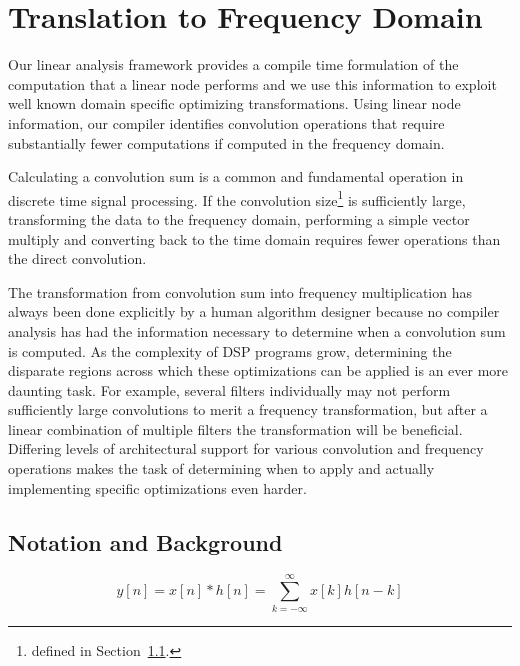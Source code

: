 
\section{Translation to Frequency Domain}
\label{sec:freq}

Our linear analysis framework provides a compile time formulation of
the computation that a linear node performs and we use this
information to exploit well known domain specific optimizing
transformations. Using linear node information, our compiler
identifies convolution operations that require substantially fewer
computations if computed in the frequency domain.

Calculating a convolution sum is a common and fundamental operation in
discrete time signal processing.  If the convolution size\footnote{
defined in Section~\ref{sec:method-opt-notation}.} is
sufficiently large, transforming the data to the frequency domain,
performing a simple vector multiply and converting back to the time
domain requires fewer operations than the direct convolution.

The transformation from convolution sum into frequency multiplication
has always been done explicitly by a human algorithm designer because no 
compiler analysis has had the information necessary to determine 
when a convolution sum is computed. As the complexity of DSP 
programs grow, determining the disparate regions across which 
these optimizations can be applied is an ever more daunting task. 
For example, several filters individually may not perform sufficiently large 
convolutions to merit a frequency transformation, but after a linear 
combination of multiple filters the transformation will be beneficial.
Differing levels of architectural support for various convolution and 
frequency operations makes the task of determining when to apply and 
actually implementing specific optimizations even harder.

\subsection{Notation and Background}
\label{sec:method-opt-notation}

\begin{equation}
\label{eqn:conv-sum-again}
y[n]=x[n]*h[n]=\sum_{k=-\infty}^{\infty}x[k]h[n-k]
\end{equation}

